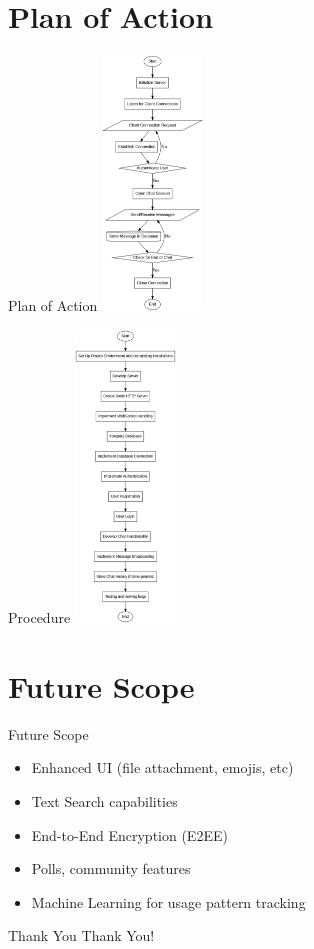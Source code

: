 \documentclass{beamer}
\begin{document}
\section{Plan of Action}
\begin{frame}{Plan of Action}
    \centering
    \includegraphics[width=0.2\textwidth]{graph.png}
\end{frame}

\begin{frame}{Procedure}
    \centering
    \includegraphics[width=0.2\textwidth]{implementation.png}
\end{frame}

\section{Future Scope}
\begin{frame}{Future Scope}
    \begin{itemize}
        \item Enhanced UI (file attachment, emojis, etc)
        \item Text Search capabilities
        \item End-to-End Encryption (E2EE)
        \item Polls, community features
        \item Machine Learning for usage pattern tracking
    \end{itemize}
\end{frame}


\begin{frame}{Thank You}
    \centering
    \Huge Thank You!
\end{frame}
\end{document}
